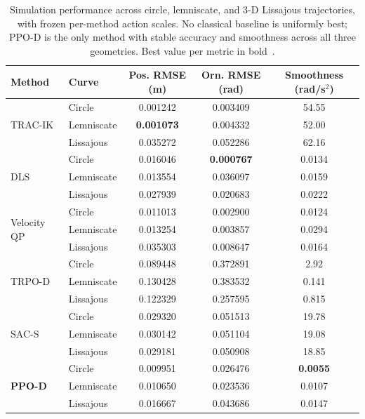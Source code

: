 \begin{table}[htbp]
\centering
\caption{Simulation performance across circle, lemniscate, and 3-D Lissajous trajectories, with
frozen per-method action scales. No classical baseline is uniformly best; PPO-D is the only method
with stable accuracy and smoothness across all three geometries. Best value per metric in
bold~\citep{sk2025diktracking}.}
\label{tab:dikppo_simresults}
\footnotesize
\begin{tabular}{llccc}
\toprule
\textbf{Method} & \textbf{Curve} & \textbf{Pos. RMSE (m)} & \textbf{Orn. RMSE (rad)} & \textbf{Smoothness (rad/s$^2$)} \\
\midrule
\multirow{3}{*}{TRAC-IK~\citep{beeson2015trac}} & Circle & 0.001242 & 0.003409 & 54.55 \\
                          & Lemniscate & \textbf{0.001073} & 0.004332 & 52.00 \\
                          & Lissajous & 0.035272 & 0.052286 & 62.16 \\
\midrule
\multirow{3}{*}{DLS~\citep{chiaverini1994review}}     & Circle & 0.016046 & \textbf{0.000767} & 0.0134 \\
                          & Lemniscate & 0.013554 & 0.036097 & 0.0159 \\
                          & Lissajous & 0.027939 & 0.020683 & 0.0222 \\
\midrule
\multirow{3}{*}{Velocity QP~\citep{zhang2013variable}} & Circle & 0.011013 & 0.002900 & 0.0124 \\
                          & Lemniscate & 0.013254 & 0.003857 & 0.0294 \\
                          & Lissajous & 0.035303 & 0.008647 & 0.0164 \\
\midrule
\multirow{3}{*}{TRPO-D~\citep{schulman2015trust}}  & Circle & 0.089448 & 0.372891 & 2.92 \\
                          & Lemniscate & 0.130428 & 0.383532 & 0.141 \\
                          & Lissajous & 0.122329 & 0.257595 & 0.815 \\
\midrule
\multirow{3}{*}{SAC-S~\citep{haarnoja2018soft}}   & Circle & 0.029320 & 0.051513 & 19.78 \\
                          & Lemniscate & 0.030142 & 0.051104 & 19.08 \\
                          & Lissajous & 0.029181 & 0.050908 & 18.85 \\
\midrule
\multirow{3}{*}{\textbf{PPO-D}~\citep{schulman2017proximal}} & Circle & 0.009951 & 0.026476 & \textbf{0.0055} \\
                          & Lemniscate & 0.010650 & 0.023536 & 0.0107 \\
                          & Lissajous & 0.016667 & 0.043686 & 0.0147 \\
\bottomrule
\end{tabular}
\end{table}


